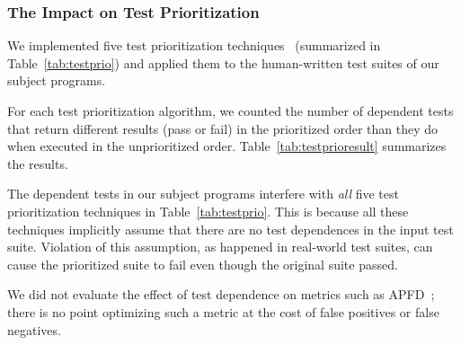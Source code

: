 
\subsubsection{The Impact on Test Prioritization}
\label{sec:impact}

We implemented five test prioritization techniques~\cite{Elbaum:2000:PTC:347324.348910} (summarized in Table~\ref{tab:testprio}) and
applied them to the human-written test suites of our subject programs.


For each test prioritization algorithm, we counted the number
of dependent tests that return different results (pass or fail) in
the prioritized order than they do when executed in the
unprioritized order. Table~\ref{tab:testprioresult} summarizes
the results.

The dependent tests in our subject programs interfere with
\textit{all} five test prioritization techniques in
Table~\ref{tab:testprio}.
This is because all these techniques
implicitly assume that there are no test dependences in
the input test suite. Violation of this assumption, as
happened in real-world test suites, can cause the prioritized suite to fail
even though the original suite passed.

We did not evaluate the effect of test dependence on metrics such as 
APFD~\cite{Rothermel:1999:TCP:519621.853398}; there is no point optimizing
such a metric at the cost of false positives or false negatives.






